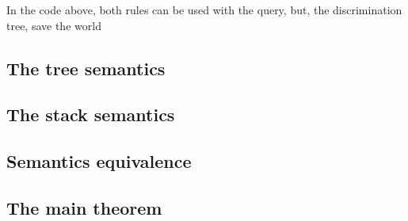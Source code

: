 In the code above, both rules can be used with the query, but, 
the discrimination tree, save the world


\subsection{The tree semantics}
\subsection{The stack semantics}
\cite{pusch1996}
\subsection{Semantics equivalence}

\cite{yves-equiv}

\subsection{The main theorem}

